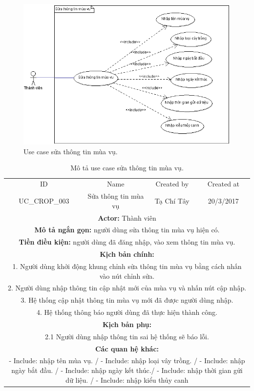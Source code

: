 \documentclass[a4paper,12pt,oneside]{article}
\begin{document}
\begin{figure}[H]
	\centering
	\includegraphics[scale=.8]{hinh/sttmv.png}
	\caption{Use case sửa thông tin mùa vụ.}
\end{figure}

\begin{table}[!htp]
\centering
\begin{tabularx}{\linewidth}{ |c||c|c|c| }
\hline
ID & Name & Created by & Created at\\
UC\_CROP\_003 & Sửa thông tin mùa vụ & Tạ Chí Tây & 20/3/2017\\
\hline
\multicolumn{4}{|X|}{\textbf{Actor:} Thành viên }\\
\hline
\multicolumn{4}{|X|}{\textbf{Mô tả ngắn gọn:} người dùng sửa thông tin mùa vụ hiện có. }\\
\hline
\multicolumn{4}{|X|}{\textbf{Tiền điều kiện:} người dùng đã đăng nhập, vào xem thông tin mùa vụ.}\\
\hline
\multicolumn{4}{|X|}{\textbf{Kịch bản chính:}}\\
\multicolumn{4}{|X|}{ 1.	Người dùng khởi động khung chỉnh sửa thông tin mùa vụ bằng cách nhấn vào nút chỉnh sửa.}\\
\multicolumn{4}{|X|}{
2.	Người dùng nhập thông tin cập nhật mới của mùa vụ và nhấn nút cập nhập.}\\
\multicolumn{4}{|X|}{
3.	Hệ thống cập nhật thông tin mùa vụ mới đã được người dùng nhập.}\\
\multicolumn{4}{|X|}{4. Hệ thống thông báo người dùng đã thực hiện thành công.}\\
\hline
\multicolumn{4}{|X|}{\textbf{Kịch bản phụ:}}\\
\multicolumn{4}{|X|}{2.1    Người dùng nhập thông tin sai hệ thống sẽ báo lỗi.}\\
\hline
\multicolumn{4}{|X|}{\textbf{Các quan hệ khác:}}\\
\multicolumn{4}{|X|}{- Include: nhập tên mùa vụ. / - Include: nhập loại vây trồng. / - Include: nhập ngày bắt đầu. / - Include: nhập ngày kết thúc./ - Include: nhập thời gian gửi dữ liệu. / - Include: nhập kiểu thủy canh}\\
\hline

\end{tabularx}
\caption{Mô tả use case sửa thông tin mùa vụ.}
\end{table}
\end{document}

